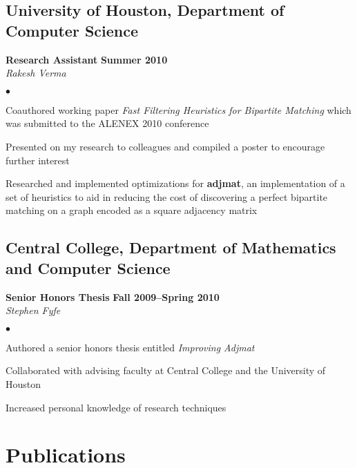 \documentclass[10pt,letterpaper]{article}
\renewenvironment{itemize}{
  \begin{list}{}{
      \setlength{\leftmargin}{1.5em}
      \setlength{\itemsep}{0.25em}
      \setlength{\parskip}{0pt}
      \setlength{\parsep}{0.25em}
    }
  }{
  \end{list}
}
\newenvironment{bitemize}{
  \begin{list}{$\bullet$}{
      \setlength{\leftmargin}{1.5em}
      \setlength{\itemsep}{0.25em}
      \setlength{\parskip}{0pt}
      \setlength{\parsep}{0.25em}
    }
  }{
  \end{list}
}
\begin{document}
\subsection*{University of Houston, Department of Computer Science}

\begin{itemize}
\item \textbf{Research Assistant} \hfill \textbf{Summer 2010}\\
  \textit{Rakesh Verma}
  \begin{bitemize}
  \item Coauthored working paper \textit{Fast Filtering Heuristics for
      Bipartite Matching} which was submitted to the ALENEX 2010
    conference
  \item Presented on my research to colleagues and compiled a poster
    to encourage further interest
  \item Researched and implemented optimizations for
    \textbf{adjmat}, an implementation of a set of heuristics to aid
    in reducing the cost of discovering a perfect bipartite matching
    on a graph encoded as a square adjacency matrix
  \end{bitemize}
\end{itemize}

\subsection*{Central College, Department of Mathematics and
  Computer Science}

\begin{itemize}
\item \textbf{Senior Honors Thesis} \hfill \textbf{Fall
    2009--Spring 2010}\\
  \textit{Stephen Fyfe}
  \begin{bitemize}
  \item Authored a senior honors thesis entitled \textit{Improving Adjmat}
  \item Collaborated with advising faculty at Central College and the
    University of Houston
  \item Increased personal knowledge of research techniques
  \end{bitemize}
\end{itemize}

\pagebreak

\section*{Publications}
\end{document}
